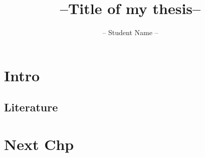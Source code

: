 \documentclass{iiththesis}
\title{--Title of my thesis--}
\author{-- Student Name --}
\begin{document}
\chapter{Intro}
\section{Literature}

\chapter{Next Chp}


\clearpage
\newpage
{} %


\end{document}
